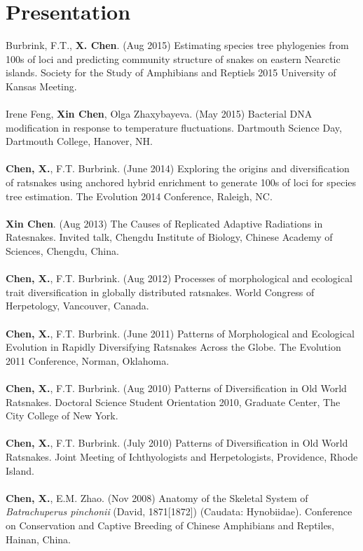 \documentclass[12pt]{article}
\begin{document}
\section{Presentation}
Burbrink, F.T., \textbf{X. Chen}. (Aug 2015) Estimating species tree phylogenies from 100s of loci and predicting community structure of snakes on eastern Nearctic islands. Society for the Study of Amphibians and Reptiels 2015 University of Kansas Meeting.\\
\\[-0.30\baselineskip]%
Irene Feng, \textbf{Xin Chen}, Olga Zhaxybayeva. (May 2015) Bacterial DNA modification in response to temperature fluctuations. Dartmouth Science Day, Dartmouth College, Hanover, NH.\\
\\[-0.30\baselineskip]%
\textbf{Chen, X.}, F.T. Burbrink. (June 2014) Exploring the origins and diversification of ratsnakes using anchored hybrid enrichment to generate 100s of loci for species tree estimation. The Evolution 2014 Conference, Raleigh, NC.\\
\\[-0.30\baselineskip]%
\textbf{Xin Chen}. (Aug 2013) The Causes of Replicated Adaptive Radiations in Ratesnakes. Invited talk, Chengdu Institute of Biology, Chinese Academy of Sciences, Chengdu, China.\\
\\[-0.30\baselineskip]%
\textbf{Chen, X.}, F.T. Burbrink. (Aug 2012) Processes of morphological and ecological trait diversification in globally distributed ratsnakes. World Congress of Herpetology, Vancouver, Canada.\\
\\[-0.30\baselineskip]%
\textbf{Chen, X.}, F.T. Burbrink. (June 2011) Patterns of Morphological and Ecological Evolution in Rapidly Diversifying Ratsnakes Across the Globe. The Evolution 2011 Conference, Norman, Oklahoma.\\
\\[-0.30\baselineskip]%
\textbf{Chen, X.}, F.T. Burbrink. (Aug 2010) Patterns of Diversification in Old World Ratsnakes. Doctoral Science Student Orientation 2010, Graduate Center, The City College of New York. \\
\\[-0.30\baselineskip]%
\textbf{Chen, X.}, F.T. Burbrink. (July 2010) Patterns of Diversification in Old World Ratsnakes.   Joint Meeting of Ichthyologists and Herpetologists, Providence, Rhode Island.  \\
\\[-0.30\baselineskip]%
\textbf{Chen, X.}, E.M. Zhao. (Nov 2008) Anatomy of the Skeletal System of \textit{Batrachuperus pinchonii} (David, 1871[1872]) (Caudata: Hynobiidae). Conference on Conservation and Captive Breeding of Chinese Amphibians and Reptiles, Hainan, China. \\
\\[-0.30\baselineskip]%
\\
\end{document}
